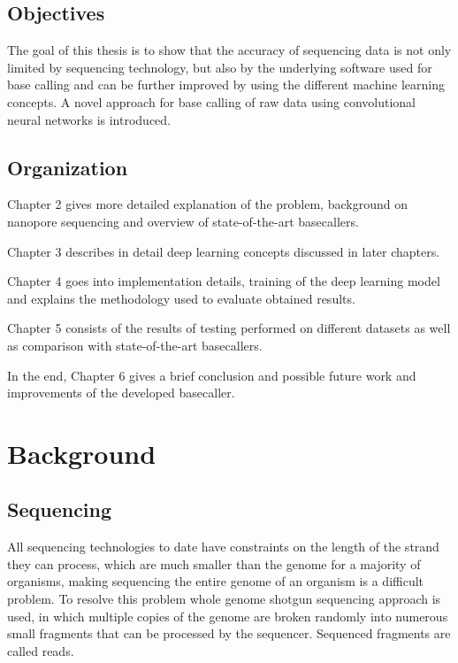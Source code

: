 \documentclass[times, utf8, diplomski, numeric, english]{fer}
\begin{document}
\section{Objectives}
The goal of this thesis is to show that the accuracy of sequencing data is not only limited by sequencing technology, but also by the underlying software used for base calling and can be further improved by using the different machine learning concepts. A novel approach for base calling of raw data using convolutional neural networks is introduced.

\section{Organization}
\indent Chapter 2 gives more detailed explanation of the problem, background on nanopore sequencing and overview of state-of-the-art basecallers.

Chapter 3 describes in detail deep learning concepts discussed in later chapters.

Chapter 4 goes into implementation details, training of the deep learning model and explains the methodology used to evaluate obtained results. 

Chapter 5 consists of the results of testing performed on different datasets as well as comparison with state-of-the-art basecallers.

In the end, Chapter 6 gives a brief conclusion and possible future work and improvements of the developed basecaller.

\chapter{Background}

\section{Sequencing}

All sequencing technologies to date have constraints on the length of the strand they can process, which are much smaller than the genome for a majority of organisms, making sequencing the entire genome of an organism is a difficult problem. To resolve this problem whole genome shotgun sequencing approach is used, in which multiple copies of the genome are broken randomly into numerous small fragments that can be processed by the sequencer. Sequenced fragments are called reads.
\end{document}
